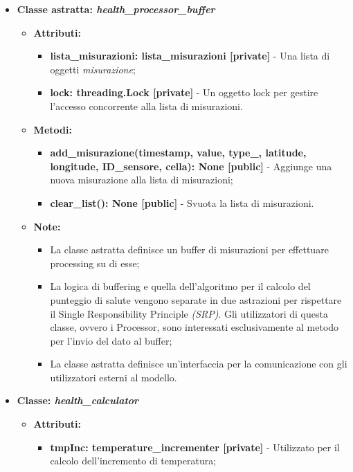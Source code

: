 \begin{itemize}
    \item\textbf{Classe astratta: \textit{health\_processor\_buffer}}
    \begin{itemize}
    \item\textbf{Attributi:}
        \begin{itemize}
        \item \textbf{lista\_misurazioni: lista\_misurazioni [private]} - Una lista di oggetti \textit{misurazione};
        \item \textbf{lock: threading.Lock [private]} - Un oggetto lock per gestire l'accesso concorrente alla lista di misurazioni.
    \end{itemize}
    \item \textbf{Metodi:}
    \begin{itemize}
        \item \textbf{add\_misurazione(timestamp, value, type\_, latitude, longitude, ID\_sensore, cella): None [public]} - Aggiunge una nuova misurazione alla lista di misurazioni;
        \item \textbf{clear\_list(): None [public]} - Svuota la lista di misurazioni.
    \end{itemize}
    \item\textbf{Note:}
        \begin{itemize}
            \item La classe astratta definisce un buffer di misurazioni per effettuare processing su di esse;
            \item La logica di buffering e quella dell'algoritmo per il calcolo del punteggio di salute vengono separate in due astrazioni per rispettare il Single Responsibility Principle \textit{(SRP)}. Gli utilizzatori di questa classe, ovvero i Processor, sono interessati esclusivamente al metodo per l'invio del dato al buffer;
            \item La classe astratta definisce un'interfaccia per la comunicazione con gli utilizzatori esterni al modello.
        \end{itemize}
    \end{itemize}
    \item{\textbf{Classe: \textit{health\_calculator}}}
    \begin{itemize}
    \item\textbf{Attributi:}
        \begin{itemize}
        \item \textbf{tmpInc: temperature\_incrementer [private]} - Utilizzato per il calcolo dell'incremento di temperatura;

\end{itemize}
\end{itemize}
\end{itemize}
